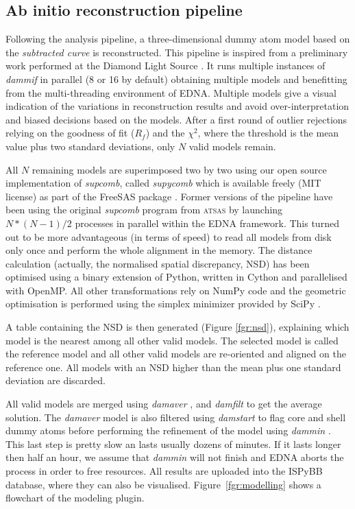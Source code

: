 \documentclass[preprint,pdf]{iucr}              %
\begin{document}
\subsection{Ab initio reconstruction pipeline}
\label{abinitio}
Following the analysis pipeline, a three-dimensional dummy atom model based
on the \textit{subtracted curve} is reconstructed.
This pipeline is inspired from a preliminary work
performed at the Diamond Light Source \cite{DiamondSE}.
It runs multiple instances of \textit{dammif} in parallel (8 or 16 by default)
obtaining multiple models \cite{dammif} and benefitting from 
the multi-threading environment of EDNA.
Multiple models give a visual indication of the variations in
reconstruction results and avoid over-interpretation and biased decisions
based on the models.
After a first round of outlier rejections relying on the goodness of fit
($R_{f}$) and the $\chi^{2}$, where the threshold is the mean value plus two
standard deviations, only $N$ valid models remain.

All $N$ remaining models are superimposed two by two using
our open source implementation of \textit{supcomb}, called
\textit{supycomb} which is available freely (MIT license) as part of the
FreeSAS package \cite{freesas}.
Former versions of the pipeline have been using the original
\textit{supcomb} \cite{supcomb} program from \textsc{atsas} by launching
$N*(N-1)/2$ processes in parallel within the EDNA framework.
This turned out to be more advantageous (in terms of speed) to read all models
from disk only once and perform the whole alignment in the memory.
The distance calculation (actually, the normalised spatial discrepancy, NSD)
has been optimised using a binary extension of Python, written in Cython
\cite{cython} and parallelised with OpenMP.
All other transformations rely on NumPy \cite{numpy} code and the geometric
optimisation is performed using the simplex minimizer provided by SciPy
\cite{scipy}.

A table containing the NSD is then generated
(Figure \ref{fgr:nsd}), explaining which model is the nearest among all
other valid models. 
The selected model is called the reference model and all other valid
models are re-oriented and aligned on the reference one.
All models with an NSD higher than the mean plus one standard deviation are
discarded.

All valid models are merged using \textit{damaver} \cite{damaver},
and \textit{damfilt} to get the average solution. 
The \textit{damaver} model is also filtered using \textit{damstart} to flag
core and shell dummy atoms before performing the refinement of the model using
\textit{dammin} \cite{dammin}.
This last step is pretty slow an lasts usually dozens of minutes. 
If it lasts longer then half an hour, we assume that \textit{dammin} will not finish and 
EDNA aborts the process in order to free resources. 
All results are uploaded into the ISPyBB database, where they can also be
visualised. 
Figure~\ref{fgr:modelling} shows a flowchart of the modeling plugin.
\end{document}
